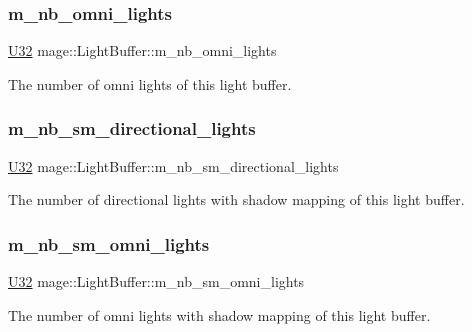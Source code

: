 \subsubsection{\texorpdfstring{m\+\_\+nb\+\_\+omni\+\_\+lights}{m\_nb\_omni\_lights}}
{\footnotesize\ttfamily \hyperlink{namespacemage_a41c104c036fba3756a74e19f793eeaa1}{U32} mage\+::\+Light\+Buffer\+::m\+\_\+nb\+\_\+omni\+\_\+lights}

The number of omni lights of this light buffer. \hypertarget{structmage_1_1_light_buffer_a3f2bee584a95ff4e41a02558c45bba94}{}\label{structmage_1_1_light_buffer_a3f2bee584a95ff4e41a02558c45bba94} 
\subsubsection{\texorpdfstring{m\+\_\+nb\+\_\+sm\+\_\+directional\+\_\+lights}{m\_nb\_sm\_directional\_lights}}
{\footnotesize\ttfamily \hyperlink{namespacemage_a41c104c036fba3756a74e19f793eeaa1}{U32} mage\+::\+Light\+Buffer\+::m\+\_\+nb\+\_\+sm\+\_\+directional\+\_\+lights}

The number of directional lights with shadow mapping of this light buffer. \hypertarget{structmage_1_1_light_buffer_afef9d26eab5ebc74272c23b208f1ba0a}{}\label{structmage_1_1_light_buffer_afef9d26eab5ebc74272c23b208f1ba0a} 
\subsubsection{\texorpdfstring{m\+\_\+nb\+\_\+sm\+\_\+omni\+\_\+lights}{m\_nb\_sm\_omni\_lights}}
{\footnotesize\ttfamily \hyperlink{namespacemage_a41c104c036fba3756a74e19f793eeaa1}{U32} mage\+::\+Light\+Buffer\+::m\+\_\+nb\+\_\+sm\+\_\+omni\+\_\+lights}

The number of omni lights with shadow mapping of this light buffer. \hypertarget{structmage_1_1_light_buffer_a12ef0995fa34d6d132402ff5ab651b9b}{}\label{structmage_1_1_light_buffer_a12ef0995fa34d6d132402ff5ab651b9b} 
